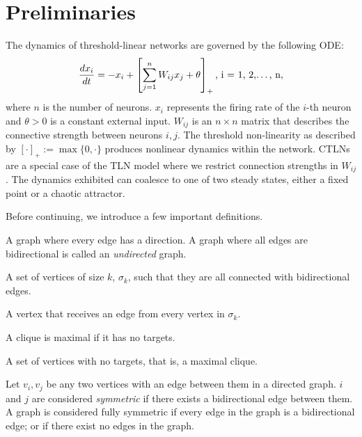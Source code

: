 
\section{Preliminaries}
The dynamics of threshold-linear networks are governed by the following ODE:
\[
    \frac{dx_i}{dt} = -x_i + \left[ \sum^{n}_{j=1} W_{ij} x_j + \theta \right]_+ \mbox{, i = 1, 2,\dots, n},
\]
where $n$ is the number of neurons. $x_i$ represents the firing rate of the $i$-th neuron and $\theta>0$ is a constant external input. $W_{ij}$ is an $n\times n$ matrix that describes the connective strength between neurons $i,j$. The threshold non-linearity as described by $[\cdot]_+ := \max\{0,\cdot\}$ produces nonlinear dynamics within the network. CTLNs are a special case of the TLN model where we restrict connection strengths in $W_{ij}$. The dynamics exhibited can coalesce to one of two steady states, either a fixed point or a chaotic attractor.

Before continuing, we introduce a few important definitions.
\begin{defn}
    A graph where every edge has a direction. A graph where all edges are bidirectional is called an \textit{undirected} graph.
\end{defn}

\begin{defn}[Clique]
    A set of vertices of size $k$, $\sigma_k$, such that they are all connected with bidirectional edges.
\end{defn}

\begin{defn}
    A vertex that receives an edge from every vertex in $\sigma_k$.
\end{defn}

\begin{defn}[Maximality]
    A clique is maximal if it has no targets.
\end{defn}

\begin{defn}
    A set of vertices with no targets, that is, a maximal clique.
\end{defn}

\begin{defn}[Symmetry]
    Let $v_i,v_j$ be any two vertices with an edge between them in a directed graph. $i$ and $j$ are considered \textit{symmetric} if there exists a bidirectional edge between them. A graph is considered fully symmetric if every edge in the graph is a bidirectional edge; or if there exist no edges in the graph.
\end{defn}

